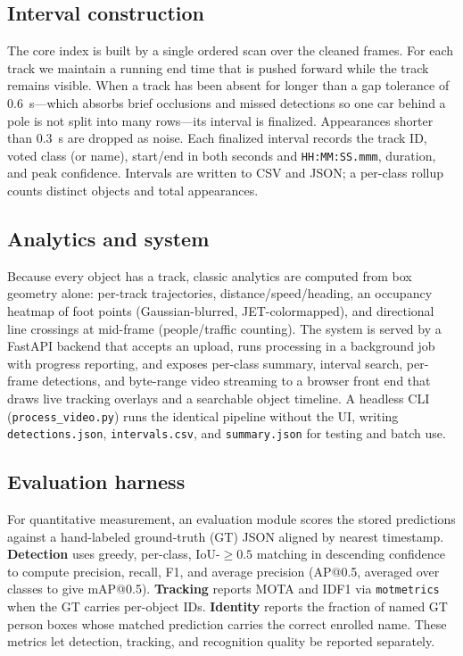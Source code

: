 \documentclass[conference]{IEEEtran}
\begin{document}
\subsection{Interval construction}
The core index is built by a single ordered scan over the cleaned
frames. For each track we maintain a running end time that is pushed
forward while the track remains visible. When a track has been absent
for longer than a gap tolerance of $0.6$~s---which absorbs brief
occlusions and missed detections so one car behind a pole is not split
into many rows---its interval is finalized. Appearances shorter than
$0.3$~s are dropped as noise. Each finalized interval records the track
ID, voted class (or name), start/end in both seconds and
\texttt{HH:MM:SS.mmm}, duration, and peak confidence. Intervals are
written to CSV and JSON; a per-class rollup counts distinct objects and
total appearances.

\subsection{Analytics and system}
Because every object has a track, classic analytics are computed from
box geometry alone: per-track trajectories, distance/speed/heading,
an occupancy heatmap of foot points (Gaussian-blurred, JET-colormapped),
and directional line crossings at mid-frame (people/traffic counting).
The system is served by a FastAPI backend that accepts an upload, runs
processing in a background job with progress reporting, and exposes
per-class summary, interval search, per-frame detections, and byte-range
video streaming to a browser front end that draws live tracking overlays
and a searchable object timeline. A headless CLI
(\texttt{process\_video.py}) runs the identical pipeline without the UI,
writing \texttt{detections.json}, \texttt{intervals.csv}, and
\texttt{summary.json} for testing and batch use.

\subsection{Evaluation harness}
For quantitative measurement, an evaluation module scores the stored
predictions against a hand-labeled ground-truth (GT) JSON aligned by
nearest timestamp. \textbf{Detection} uses greedy, per-class, IoU-$\ge0.5$
matching in descending confidence to compute precision, recall, F1, and
average precision (AP@0.5, averaged over classes to give mAP@0.5).
\textbf{Tracking} reports MOTA and IDF1 via \texttt{motmetrics} when the
GT carries per-object IDs. \textbf{Identity} reports the fraction of
named GT person boxes whose matched prediction carries the correct
enrolled name. These metrics let detection, tracking, and recognition
quality be reported separately.
\end{document}
